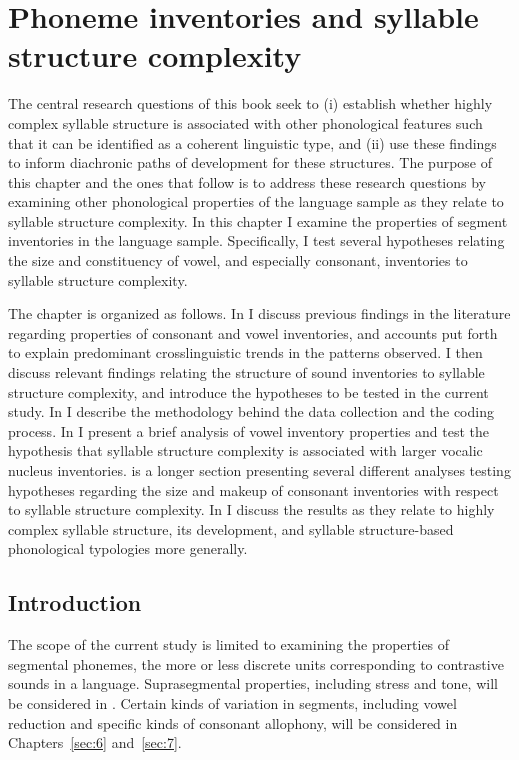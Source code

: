 \chapter{Phoneme inventories and syllable structure complexity}\label{sec:4}

  The central research questions of this book seek to (i) establish whether highly complex syllable structure is associated with other phonological features such that it can be identified as a coherent linguistic type, and (ii) use these findings to inform diachronic paths of development for these structures. The purpose of this chapter and the ones that follow is to address these research questions by examining other phonological properties of the language sample as they relate to syllable structure complexity. In this chapter I examine the properties of segment inventories in the language sample. Specifically, I test several hypotheses relating the size and constituency of vowel, and especially consonant, inventories to syllable structure complexity.

  The chapter is organized as follows. In  I discuss previous findings in the literature regarding properties of consonant and vowel inventories, and accounts put forth to explain predominant crosslinguistic trends in the patterns observed. I then discuss relevant findings relating the structure of sound inventories to syllable structure complexity, and introduce the hypotheses to be tested in the current study. In  I describe the methodology behind the data collection and the coding process. In  I present a brief analysis of vowel inventory properties and test the hypothesis that syllable structure complexity is associated with larger vocalic nucleus inventories.  is a longer section presenting several different analyses testing hypotheses regarding the size and makeup of consonant inventories with respect to syllable structure complexity. In  I discuss the results as they relate to highly complex syllable structure, its development, and syllable structure-based phonological typologies more generally.

\section{Introduction}\label{sec:4.1}

  The scope of the current study is limited to examining the properties of segmental phonemes, the more or less discrete units corresponding to contrastive sounds in a language. Suprasegmental properties, including stress and tone, will be considered in . Certain kinds of variation in segments, including vowel reduction and specific kinds of consonant allophony, will be considered in Chapters~\ref{sec:6} and~\ref{sec:7}.

